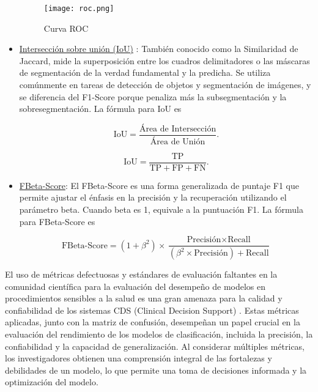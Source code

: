 \documentclass[10pt, oneside, a4paper]{article}
\begin{document}
\begin{itemize}
		\begin{figure}[H]
			\centering
			\texttt{[image: roc.png]}
			\caption{Curva ROC}
			\label{fig:roc}
		\end{figure}	

		
		\item \href{https://www.tensorflow.org/api_docs/python/tf/keras/metrics/IoU}{Intersección sobre unión (IoU)} \cite{muller2022guideline}: También conocido como la Similaridad de Jaccard, mide la superposición entre los cuadros delimitadores o las máscaras de segmentación de la verdad fundamental y la predicha. Se utiliza comúnmente en tareas de detección de objetos y segmentación de imágenes, y se diferencia del F1-Score porque penaliza más la subsegmentación y la sobresegmentación. La fórmula para IoU es
		
		\begin{equation}\label{eq:iou}
			\text{IoU} = \frac{\text{Área de Intersección}}{\text{Área de Unión}}.
		\end{equation}

		\begin{equation}\label{eq:iou2}
			\text{IoU} = \frac{\text{TP}}{\text{TP} + \text{FP} + \text{FN}}.
		\end{equation}		
		
		\item \href{https://www.tensorflow.org/api_docs/python/tf/keras/metrics/FBetaScore}{FBeta-Score}: El FBeta-Score es una forma generalizada de puntaje F1 que permite ajustar el énfasis en la precisión y la recuperación utilizando el parámetro beta. Cuando beta es 1, equivale a la puntuación F1. La fórmula para FBeta-Score es
		
		 \begin{equation}\label{eq:fbeta}
		 	\text{FBeta-Score} = (1 + \beta^2) \times \frac{\text{Precisión} \times \text{Recall}}{(\beta^2 \times \text{Precisión}) + \text{Recall}}
		 \end{equation}
		 
		
		
	\end{itemize}
	
	El uso de métricas defectuosas y estándares de evaluación faltantes en la comunidad científica para la evaluación del desempeño de modelos en procedimientos sensibles a la salud es una gran amenaza para la calidad y confiabilidad de los sistemas CDS (Clinical Decision Support) \cite{muller2022guideline}. Estas métricas aplicadas, junto con la matriz de confusión, desempeñan un papel crucial en la evaluación del rendimiento de los modelos de clasificación, incluida la precisión, la confiabilidad y la capacidad de generalización. Al considerar múltiples métricas, los investigadores obtienen una comprensión integral de las fortalezas y debilidades de un modelo, lo que permite una toma de decisiones informada y la optimización del modelo.
	
\end{document}
